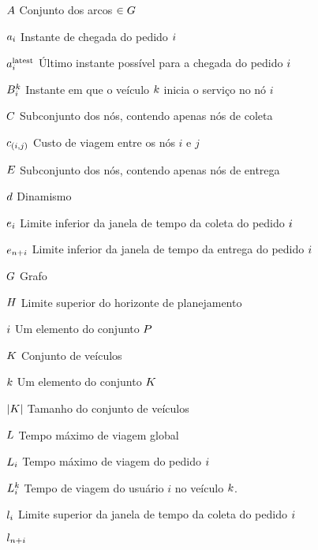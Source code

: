 


\begin{simbolos}
    \item[$A$]{Conjunto dos arcos $\in G$}
    \item[$a_i$] Instante de chegada do pedido $i$
    \item[$a{}_{i{}}^{\mathrm{latest}}$]
      Último instante possível para a chegada do pedido $i$
    \item[$B_i^k$] Instante em que o veículo $k$ inicia o serviço
      no nó $i$
    \item[$C$] Subconjunto dos nós, contendo apenas nós de coleta
    \item[$c_{(i,j)}$] Custo de viagem entre os nós $i$ e $j$
    \item[$E$] Subconjunto dos nós, contendo apenas nós de entrega
    \item[$d$] Dinamismo
    \item[$e_{i}$]
      Limite inferior da janela de tempo da coleta do pedido $i$
    \item[$e_{n + i}$]
      Limite inferior da janela de tempo da entrega do pedido $i$
    \item[$G$] Grafo
    \item[$H$] Limite superior do horizonte de planejamento
    \item[$i$] Um elemento do conjunto $P$
    \item[$K$] Conjunto de veículos
    \item[$k$] Um elemento do conjunto $K$
    \item[$|K|$] Tamanho do conjunto de veículos
    \item[$L$] Tempo máximo de viagem global
    \item[$L_i$] Tempo máximo de viagem do pedido 
      $i$
    \item[$L^k_i$] Tempo de viagem do usuário $i$ no veículo 
      $k$.
    \item[$l_{i}$]
      Limite superior da janela de tempo da coleta do pedido $i$
    \item[$l_{n + i}$]

\end{simbolos}
